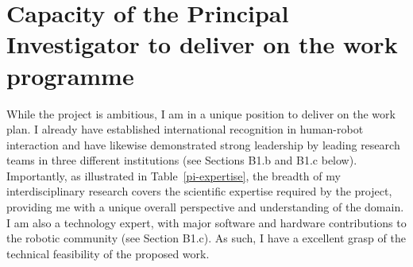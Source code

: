 \section{Capacity of the Principal Investigator to deliver on the work programme}

While the project is ambitious, I am in a unique position to deliver on the
\project work plan. I already have established international recognition in
human-robot interaction and have likewise demonstrated strong leadership by
leading research teams in three different institutions (see Sections B1.b and
B1.c below). Importantly, as illustrated in Table~\ref{pi-expertise}, the
breadth of my interdisciplinary research covers the scientific expertise
required by the project, providing me with a unique overall perspective and
understanding of the domain. I am also a technology expert, with major software
and hardware contributions to the robotic community (see Section B1.c). As such,
I have a excellent grasp of the technical feasibility of the proposed work.



